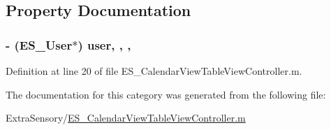 \subsection{Property Documentation}
\hypertarget{category_e_s___calendar_view_table_view_controller_07_08_ad51ebca1237a8c0677b286bf1fbe832c}{
\subsubsection[{user}]{\setlength{\rightskip}{0pt plus 5cm}-\/ ({\bf E\+S\+\_\+\+User}$\ast$) user\hspace{0.3cm}{\ttfamily [read]}, {\ttfamily [write]}, {\ttfamily [nonatomic]}, {\ttfamily [weak]}}}\label{category_e_s___calendar_view_table_view_controller_07_08_ad51ebca1237a8c0677b286bf1fbe832c}


Definition at line 20 of file E\+S\+\_\+\+Calendar\+View\+Table\+View\+Controller.\+m.



The documentation for this category was generated from the following file\+:\begin{DoxyCompactItemize}
\item 
Extra\+Sensory/\hyperlink{_e_s___calendar_view_table_view_controller_8m}{E\+S\+\_\+\+Calendar\+View\+Table\+View\+Controller.\+m}\end{DoxyCompactItemize}
